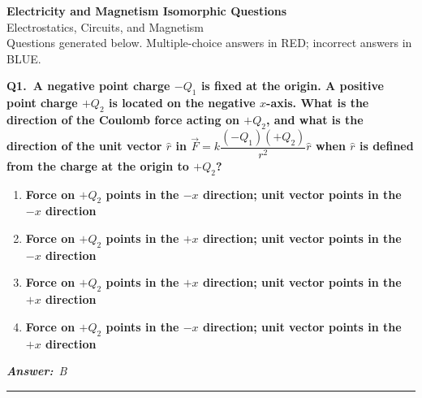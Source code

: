 \documentclass[11pt]{article}
\newcommand{\QuestionStyle}[1]{{\large\bfseries\boldmath #1}}
\newcommand{\AnswerStyle}[1]{{\large\bfseries\boldmath #1}}
\newcommand{\ReasonStyle}[1]{{\normalsize #1}}
\newif\ifshowreason
\newcommand{\Correct}[2]{%
  \item \AnswerStyle{\textcolor{AnsRed}{#1}}%
  \ifshowreason\\[-0.2em]
    \ReasonStyle{\textcolor{AnsRed}{#2}}%
  \fi
}
\newcommand{\Wrong}[2]{%
  \item \AnswerStyle{\textcolor{WrongBlue}{#1}}%
  \ifshowreason\\[-0.2em]
    \ReasonStyle{\textcolor{WrongBlue}{#2}}%
  \fi
}
\newcommand{\QBlock}[4]{%
  \Needspace{8\baselineskip}%
  \noindent
  \begin{minipage}{\linewidth}
    \QuestionStyle{#1.~#2}

    \vspace{0.25em}
    \begin{enumerate}
      #3
    \end{enumerate}

    \vspace{0.1em}
    \noindent\textcolor{AnsRed}{\textit{\textbf{Answer:}~#4}}

    \vspace{0.25em}
    \hrule height 0.4pt
  \end{minipage}
  \vspace{0.75em}
}
\begin{document}
\begin{center}
{\huge \textbf{Electricity and Magnetism Isomorphic Questions}}\\[0.25em]
{\Large Electrostatics, Circuits, and Magnetism}\\[0.25em]
{\large Questions generated below. Multiple-choice answers in RED; incorrect answers in BLUE.}
\end{center}

\vspace{0.75em}

\QBlock{Q1}{A negative point charge $-Q_1$ is fixed at the origin. A positive point charge $+Q_2$ is located on the negative $x$-axis. What is the direction of the Coulomb force acting on $+Q_2$, and what is the direction of the unit vector $\hat r$ in $\vec F = k\dfrac{(-Q_1)(+Q_2)}{r^2}\hat r$ when $\hat r$ is defined from the charge at the origin to $+Q_2$?}{%
\Wrong{Force on $+Q_2$ points in the $-x$ direction; unit vector points in the $-x$ direction}{This assumes the force must point in the same direction as $\hat r$. Because the charges are opposite, the force is attractive and points toward the origin, which is in the $+x$ direction from the location of $+Q_2$.}
\Correct{Force on $+Q_2$ points in the $+x$ direction; unit vector points in the $-x$ direction}{The unit vector $\hat r$ is defined from the source charge at the origin to the field point where $+Q_2$ sits, so it points along the negative $x$ direction. Since $q_1q_2<0$, Coulomb's law gives a force opposite to $\hat r$, so the force on $+Q_2$ points in the positive $x$ direction, toward the origin.}
\Wrong{Force on $+Q_2$ points in the $+x$ direction; unit vector points in the $+x$ direction}{This gets the attractive force direction right but reverses the definition of the separation unit vector. With the second charge on the negative $x$-axis, $\hat r$ from the origin to that charge must point in the $-x$ direction.}
\Wrong{Force on $+Q_2$ points in the $-x$ direction; unit vector points in the $+x$ direction}{This reverses both directions. Opposite charges attract, so the force on the positive charge must point toward the origin, not farther into the negative $x$ region.}
}{B}
\end{document}
